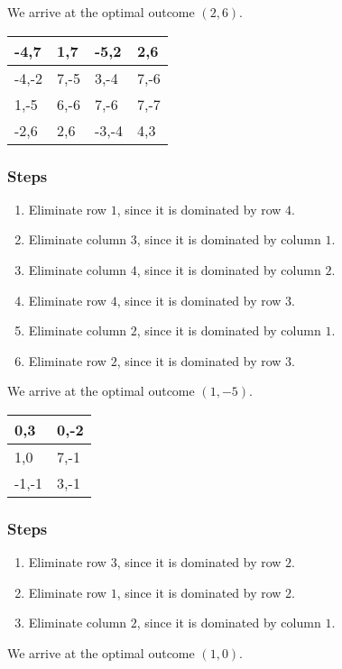 \documentclass{article}
\begin{document}
We arrive at the optimal outcome $(2, 6)$.
\newpage
\begin{table}[]
\centering
\begin{tabular}{|l|l|l|l|}
\hline-4,7 & 1,7 & -5,2 & 2,6\\ \hline
-4,-2 & 7,-5 & 3,-4 & 7,-6\\ \hline
1,-5 & 6,-6 & 7,-6 & 7,-7\\ \hline
-2,6 & 2,6 & -3,-4 & 4,3\\ \hline
\end{tabular}
\end{table}\subsubsection*{Steps}
\begin{enumerate}
\item Eliminate row $1$, since it is dominated by row $4$.
\item Eliminate column $3$, since it is dominated by column $1$.
\item Eliminate column $4$, since it is dominated by column $2$.
\item Eliminate row $4$, since it is dominated by row $3$.
\item Eliminate column $2$, since it is dominated by column $1$.
\item Eliminate row $2$, since it is dominated by row $3$.
\end{enumerate}
We arrive at the optimal outcome $(1, -5)$.
\newpage
\begin{table}[]
\centering
\begin{tabular}{|l|l|}
\hline0,3 & 0,-2\\ \hline
1,0 & 7,-1\\ \hline
-1,-1 & 3,-1\\ \hline
\end{tabular}
\end{table}\subsubsection*{Steps}
\begin{enumerate}
\item Eliminate row $3$, since it is dominated by row $2$.
\item Eliminate row $1$, since it is dominated by row $2$.
\item Eliminate column $2$, since it is dominated by column $1$.
\end{enumerate}
We arrive at the optimal outcome $(1, 0)$.
\end{document}
